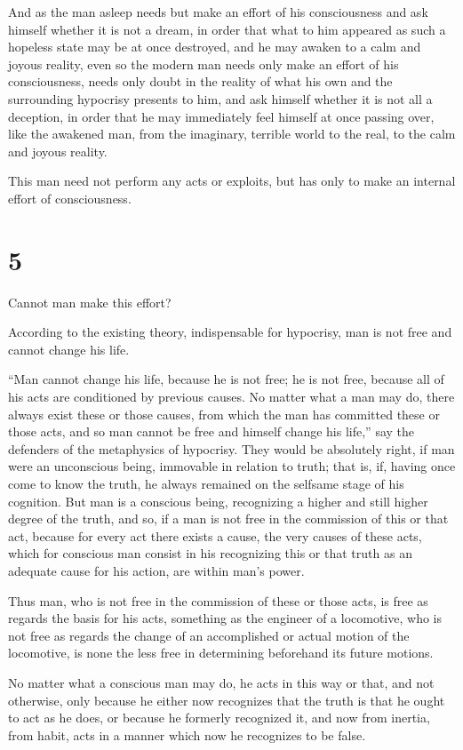 \documentclass{book}
\begin{document}
And as the man asleep needs but make an effort of his consciousness and ask himself whether it is not a dream, in order that what to him appeared as such a hopeless state may be at once destroyed, and he may awaken to a calm and joyous reality, even so the modern man needs only make an effort of his consciousness, needs only doubt in the reality of what his own and the surrounding hypocrisy presents to him, and ask himself whether it is not all a deception, in order that he may immediately feel himself at once passing over, like the awakened man, from the imaginary, terrible world to the real, to the calm and joyous reality.

This man need not perform any acts or exploits, but has only to make an internal effort of consciousness.

\section*{5}
Cannot man make this effort?

According to the existing theory, indispensable for hypocrisy, man is not free and cannot change his life.

“Man cannot change his life, because he is not free; he is not free, because all of his acts are conditioned by previous causes. No matter what a man may do, there always exist these or those causes, from which the man has committed these or those acts, and so man cannot be free and himself change his life,” say the defenders of the metaphysics of hypocrisy. They would be absolutely right, if man were an unconscious being, immovable in relation to truth; that is, if, having once come to know the truth, he always remained on the selfsame stage of his cognition. But man is a conscious being, recognizing a higher and still higher degree of the truth, and so, if a man is not free in the commission of this or that act, because for every act there exists a cause, the very causes of these acts, which for conscious man consist in his recognizing this or that truth as an adequate cause for his action, are within man’s power.

Thus man, who is not free in the commission of these or those acts, is free as regards the basis for his acts, something as the engineer of a locomotive, who is not free as regards the change of an accomplished or actual motion of the locomotive, is none the less free in determining beforehand its future motions.

No matter what a conscious man may do, he acts in this way or that, and not otherwise, only because he either now recognizes that the truth is that he ought to act as he does, or because he formerly recognized it, and now from inertia, from habit, acts in a manner which now he recognizes to be false.
\end{document}
